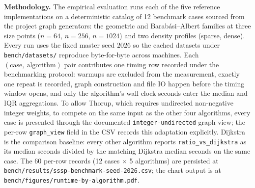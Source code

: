\documentclass[12pt]{article}
\begin{document}
\textbf{Methodology.} The empirical evaluation runs each of the five reference implementations on a deterministic catalog of 12 benchmark cases sourced from the project graph generators: the geometric and Barab\'{a}si--Albert families at three size points ($n = 64$, $n = 256$, $n = 1024$) and two density profiles (sparse, dense). Every run uses the fixed master seed $2026$ so the cached datasets under \texttt{bench/datasets/} reproduce byte-for-byte across machines. Each $(\text{case},\ \text{algorithm})$ pair contributes one timing row recorded under the benchmarking protocol: warmups are excluded from the measurement, exactly one repeat is recorded, graph construction and file IO happen before the timing window opens, and only the algorithm's wall-clock seconds enter the median and IQR aggregations. To allow Thorup, which requires undirected non-negative integer weights, to compete on the same input as the other four algorithms, every case is presented through the documented \texttt{integer-undirected} graph view; the per-row \texttt{graph\_view} field in the CSV records this adaptation explicitly. Dijkstra is the comparison baseline: every other algorithm reports \texttt{ratio\_vs\_dijkstra} as its median seconds divided by the matching Dijkstra median seconds on the same case. The 60 per-row records (12 cases $\times$ 5 algorithms) are persisted at \texttt{bench/results/sssp-benchmark-seed-2026.csv}; the chart output is at \texttt{bench/figures/runtime-by-algorithm.pdf}.
\end{document}
